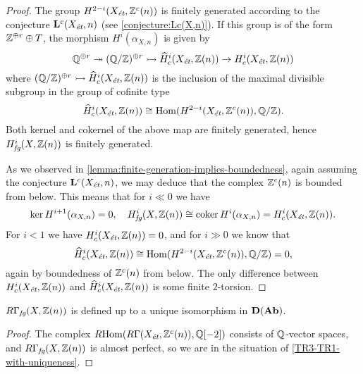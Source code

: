 \begin{proposition}
\begin{proof}
    The group $H^{2-i} (X_\text{\it ét}, \mathbb{Z}^c (n))$ is finitely generated
    according to the conjecture $\mathbf{L}^c (X_\text{\it ét}, n)$
    (see \ref{conjecture:Lc(X,n)}). If this group is of the form
    $\mathbb{Z}^{\oplus r}\oplus T$, the morphism $H^i (\alpha_{X,n})$ is given by
    \[ \mathbb{Q}^{\oplus r} \twoheadrightarrow (\mathbb{Q}/\mathbb{Z})^{\oplus r} \rightarrowtail
      \widehat{H}^i_c (X_\text{\it ét}, \mathbb{Z} (n)) \to
      H^i_c (X_\text{\it ét}, \mathbb{Z} (n)) \]
    where
    $(\mathbb{Q}/\mathbb{Z})^{\oplus r} \rightarrowtail \widehat{H}^i_c (X_\text{\it ét}, \mathbb{Z} (n))$
    is the inclusion of the maximal divisible subgroup in the group of cofinite
    type
    \[ \widehat{H}^i_c (X_\text{\it ét}, \mathbb{Z} (n)) \cong
      \operatorname{Hom} (H^{2-i} (X_\text{\it ét}, \mathbb{Z}^c (n)), \mathbb{Q}/\mathbb{Z}). \]
    Both kernel and cokernel of the above map are finitely generated, hence
    $H^i_\text{\it fg} (X, \mathbb{Z} (n))$ is finitely generated.

    As we observed in \ref{lemma:finite-generation-implies-boundedness}, again
    assuming the conjecture $\mathbf{L}^c (X_\text{\it ét}, n)$, we may deduce
    that the complex $\mathbb{Z}^c (n)$ is bounded from below. This means that for
    $i \ll 0$ we have
    \[ \ker H^{i+1} (\alpha_{X,n}) = 0,
      \quad H^i_\text{\it fg} (X, \mathbb{Z} (n)) \cong
      \operatorname{coker} H^i (\alpha_{X,n}) = H^i_c (X_\text{\it ét}, \mathbb{Z} (n)). \]
    For $i < 1$ we have $H^i_c (X_\text{\it ét}, \mathbb{Z} (n)) = 0$, and for
    $i \gg 0$ we know that
    \[ \widehat{H}^i_c (X_\text{\it ét}, \mathbb{Z} (n)) \cong
      \operatorname{Hom} (H^{2-i} (X_\text{\it ét}, \mathbb{Z}^c (n)), \mathbb{Q}/\mathbb{Z}) = 0, \]
    again by boundedness of $\mathbb{Z}^c (n)$ from below. The only difference between
    $H^i_c (X_\text{\it ét}, \mathbb{Z} (n))$ and
    $\widehat{H}^i_c (X_\text{\it ét}, \mathbb{Z} (n))$ is some finite $2$-torsion.
  \end{proof}
\end{proposition}

\begin{observation}
  \label{obs:RGammafg-defined-up-to-unique-iso}
  $R\Gamma_\text{\it fg} (X, \mathbb{Z} (n))$ is defined up to a unique isomorphism in
  $\text{\bf D} (\text{\bf Ab})$.

  \begin{proof}
    The complex $R\!\operatorname{Hom} (R\Gamma (X_\text{\it ét}, \mathbb{Z}^c (n)), \mathbb{Q} [-2])$
    consists of $\mathbb{Q}$-vector spaces, and $R\Gamma_\text{\it fg} (X, \mathbb{Z} (n))$ is
    almost perfect, so we are in the situation of \ref{TR3-TR1-with-uniqueness}.
  \end{proof}
\end{observation}

